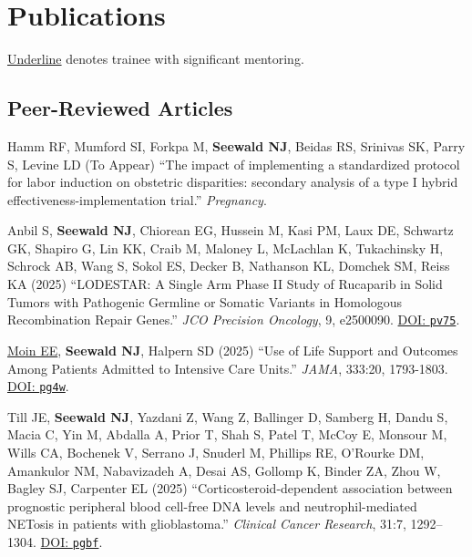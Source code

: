 \documentclass[letterpaper,11pt]{article} %
\begin{document}
	\section*{Publications}
    
    {\small \underline{Underline} denotes trainee with significant mentoring.}
    
	\subsection*{Peer-Reviewed Articles}
	
	\begin{etaremune}
        \item Hamm RF, Mumford SI, Forkpa M, \textbf{Seewald NJ}, Beidas RS, Srinivas SK, Parry S, Levine LD (To Appear) ``The impact of implementing a standardized protocol for labor induction on obstetric disparities: secondary analysis of a type I hybrid effectiveness-implementation trial.'' \textit{Pregnancy}.
        
        \item Anbil S, \textbf{Seewald NJ}, Chiorean EG, Hussein M, Kasi PM, Laux DE, Schwartz GK, Shapiro G, Lin KK, Craib M, Maloney L, McLachlan K, Tukachinsky H, Schrock AB, Wang S, Sokol ES, Decker B, Nathanson KL, Domchek SM, Reiss KA (2025) ``LODESTAR: A Single Arm Phase II Study of Rucaparib in Solid Tumors with Pathogenic Germline or Somatic Variants in Homologous Recombination Repair Genes.'' \textit{JCO Precision Oncology}, 9, e2500090. \href{https://doi.org/pv75}{DOI: \texttt{pv75}}.
    
        \item \underline{Moin EE}, \textbf{Seewald NJ}, Halpern SD (2025) ``Use of Life Support and Outcomes Among Patients Admitted to Intensive Care Units.'' \textit{JAMA}, 333:20, 1793-1803. \href{https://doi.org/pg4w}{DOI: \texttt{pg4w}}.
    
        \item Till JE, \textbf{Seewald NJ}, Yazdani Z, Wang Z, Ballinger D, Samberg H, Dandu S, Macia C, Yin M, Abdalla A, Prior T, Shah S, Patel T, McCoy E, Monsour M, Wills CA, Bochenek V, Serrano J, Snuderl M, Phillips RE, O'Rourke DM, Amankulor NM, Nabavizadeh A, Desai AS, Gollomp K, Binder ZA, Zhou W, Bagley SJ, Carpenter EL (2025) ``Corticosteroid-dependent association between prognostic peripheral blood cell-free DNA levels and neutrophil-mediated NETosis in patients with glioblastoma.'' \textit{Clinical Cancer Research}, 31:7, 1292–1304. \href{https://doi.org/pgbf}{DOI: \texttt{pgbf}}.


\end{etaremune}
\end{document}
